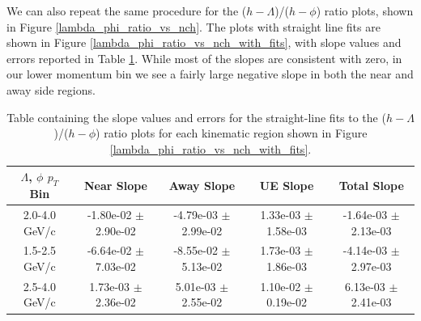 \documentclass[ALICE,manyauthors]{ALICE_analysis_notes}
\begin{document}
\clearpage

We can also repeat the same procedure for the ($h-\Lambda$)/($h-\phi$) ratio plots, shown in Figure \ref{lambda_phi_ratio_vs_nch}. The plots with straight line fits are shown in Figure \ref{lambda_phi_ratio_vs_nch_with_fits}, with slope values and errors reported in Table \ref{lambda_phi_ratio_vs_nch_fit_table}. While most of the slopes are consistent with zero, in our lower momentum bin we see a fairly large negative slope in both the near and away side regions.

\begin{table}[h!]
\centering
\begin{tabular}{| c | c | c | c | c | }
\hline
$\Lambda$, $\phi$ $p_{T}$ Bin & Near Slope & Away Slope & UE Slope & Total Slope \\
\hline
2.0-4.0 GeV/c & -1.80e-02 $\pm$ 2.90e-02 & -4.79e-03 $\pm$ 2.99e-02 & 1.33e-03 $\pm$ 1.58e-03 & -1.64e-03 $\pm$ 2.13e-03 \\
1.5-2.5 GeV/c & -6.64e-02 $\pm$ 7.03e-02 & -8.55e-02 $\pm$ 5.13e-02  & 1.73e-03 $\pm$ 1.86e-03 & -4.14e-03 $\pm$ 2.97e-03 \\
2.5-4.0 GeV/c & 1.73e-03 $\pm$ 2.36e-02 & 5.01e-03 $\pm$ 2.55e-02 & 1.10e-02 $\pm$ 0.19e-02 & 6.13e-03 $\pm$ 2.41e-03 \\
\hline
\end{tabular}
\caption{Table containing the slope values and errors for the straight-line fits to the ($h-\Lambda$)/($h-\phi$) ratio plots for each kinematic region shown in Figure \ref{lambda_phi_ratio_vs_nch_with_fits}.}
\label{lambda_phi_ratio_vs_nch_fit_table}
\end{table}

\clearpage
\end{document}
